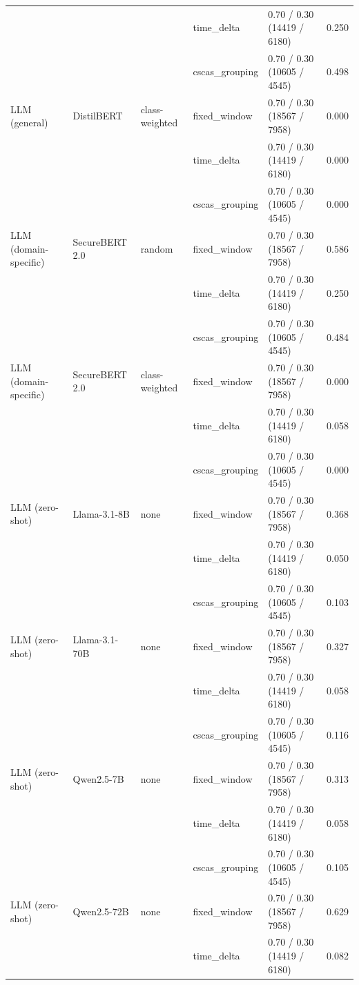 \begin{table}[htbp]
{\begin{tabular}{lllllc}
 &  &  & time\_delta & 0.70 / 0.30 (14419 / 6180) & 0.250 \\
 &  &  & cscas\_grouping & 0.70 / 0.30 (10605 / 4545) & 0.498 \\
\addlinespace
LLM (general) & DistilBERT & class-weighted & fixed\_window & 0.70 / 0.30 (18567 / 7958) & 0.000 \\
 &  &  & time\_delta & 0.70 / 0.30 (14419 / 6180) & 0.000 \\
 &  &  & cscas\_grouping & 0.70 / 0.30 (10605 / 4545) & 0.000 \\
\addlinespace
LLM (domain-specific) & SecureBERT 2.0 & random & fixed\_window & 0.70 / 0.30 (18567 / 7958) & 0.586 \\
 &  &  & time\_delta & 0.70 / 0.30 (14419 / 6180) & 0.250 \\
 &  &  & cscas\_grouping & 0.70 / 0.30 (10605 / 4545) & 0.484 \\
\addlinespace
LLM (domain-specific) & SecureBERT 2.0 & class-weighted & fixed\_window & 0.70 / 0.30 (18567 / 7958) & 0.000 \\
 &  &  & time\_delta & 0.70 / 0.30 (14419 / 6180) & 0.058 \\
 &  &  & cscas\_grouping & 0.70 / 0.30 (10605 / 4545) & 0.000 \\
\addlinespace
LLM (zero-shot) & Llama-3.1-8B & none & fixed\_window & 0.70 / 0.30 (18567 / 7958) & 0.368 \\
 &  &  & time\_delta & 0.70 / 0.30 (14419 / 6180) & 0.050 \\
 &  &  & cscas\_grouping & 0.70 / 0.30 (10605 / 4545) & 0.103 \\
\addlinespace
LLM (zero-shot) & Llama-3.1-70B & none & fixed\_window & 0.70 / 0.30 (18567 / 7958) & 0.327 \\
 &  &  & time\_delta & 0.70 / 0.30 (14419 / 6180) & 0.058 \\
 &  &  & cscas\_grouping & 0.70 / 0.30 (10605 / 4545) & 0.116 \\
\addlinespace
LLM (zero-shot) & Qwen2.5-7B & none & fixed\_window & 0.70 / 0.30 (18567 / 7958) & 0.313 \\
 &  &  & time\_delta & 0.70 / 0.30 (14419 / 6180) & 0.058 \\
 &  &  & cscas\_grouping & 0.70 / 0.30 (10605 / 4545) & 0.105 \\
\addlinespace
LLM (zero-shot) & Qwen2.5-72B & none & fixed\_window & 0.70 / 0.30 (18567 / 7958) & 0.629 \\
 &  &  & time\_delta & 0.70 / 0.30 (14419 / 6180) & 0.082 \\

\end{tabular}}
\end{table}

